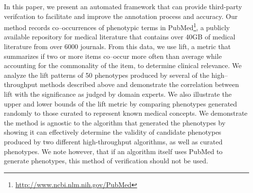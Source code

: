 \documentclass{sig-alternate-05-2015}
\begin{document}


In this paper, we present an automated framework that can provide third-party verifcation to facilitate and improve the annotation process and accuracy.
Our method records co--occurrences of phenotypic terms in PubMed\footnote{\url{http://www.ncbi.nlm.nih.gov/PubMed}}, a publicly available repository for medical literature that contains over 40GB of medical literature from over 6000 journals. 
From this data, we use lift, a metric that summarizes if two or more items co--occur more often than average while accounting for the commonality of the item, to determine clinical relevance.
We analyze the lift patterns of 50 phenotypes produced by several of the high--throughput methods described above and demonstrate the correlation between lift with the significance as judged by domain experts.
We also illustrate the upper and lower bounds of the lift metric by comparing phenotypes generated randomly to those curated to represent known medical concepts.
We demonstrate the method is agnostic to the algorithm that generated the phenotypes by showing it can effectively determine the validity of candidate phenotypes produced by two different high-throughput algorithms, as well as curated phenotypes. We note however, that if an algorithm itself uses PubMed to generate phenotypes, this method of verification should not be used.
\end{document}
